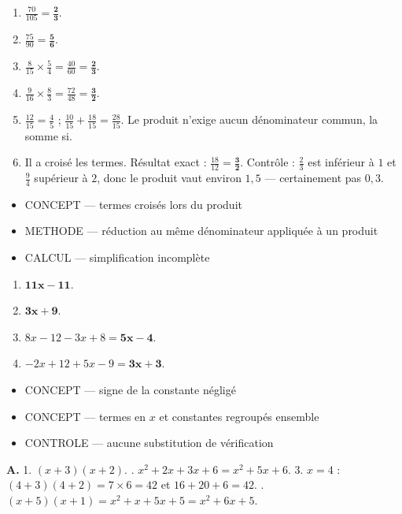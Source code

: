 \documentclass[10pt,a4paper]{article}
\begin{document}
\begin{enumerate}
\item $\frac{70}{105}=\mathbf{\frac{2}{3}}$.
\item $\frac{75}{90}=\mathbf{\frac{5}{6}}$.
\item $\frac{8}{15}\times\frac{5}{4}=\frac{40}{60}=\mathbf{\frac{2}{3}}$.
\item $\frac{9}{16}\times\frac{8}{3}=\frac{72}{48}=\mathbf{\frac{3}{2}}$.
\item $\frac{12}{15}=\frac45$ ; $\frac{10}{15}+\frac{18}{15}=\frac{28}{15}$. Le produit n'exige aucun dénominateur commun, la somme si.
\item Il a croisé les termes. Résultat exact : $\frac{18}{12}=\mathbf{\frac{3}{2}}$. Contrôle : $\frac23$ est inférieur à $1$ et $\frac94$ supérieur à $2$, donc le produit vaut environ $1{,}5$ — certainement pas $0{,}3$.
\end{enumerate}
\begin{itemize}
\item \textsc{CONCEPT} --- termes croisés lors du produit
\item \textsc{METHODE} --- réduction au même dénominateur appliquée à un produit
\item \textsc{CALCUL} --- simplification incomplète
\end{itemize}
\begin{enumerate}
\item $\mathbf{11x-11}$.
\item $\mathbf{3x+9}$.
\item $8x-12-3x+8=\mathbf{5x-4}$.
\item $-2x+12+5x-9=\mathbf{3x+3}$.
\end{enumerate}
\begin{itemize}
\item \textsc{CONCEPT} --- signe de la constante négligé
\item \textsc{CONCEPT} --- termes en $x$ et constantes regroupés ensemble
\item \textsc{CONTROLE} --- aucune substitution de vérification
\end{itemize}

\textbf{A.} 1. $(x+3)(x+2)$. . $x^2 + 2x + 3x + 6 = x^2 + 5x + 6$.
3. $x=4$ : $(4+3)(4+2)=7\times 6=42$ et $16+20+6=42$. . $(x+5)(x+1)=x^2+x+5x+5=x^2+6x+5$.
\end{document}
